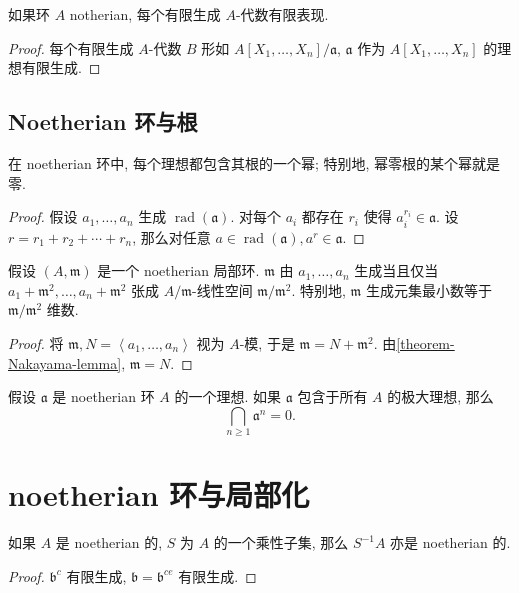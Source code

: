 \begin{corollary}
  如果环 \( A \) notherian, 每个有限生成 \( A \)-代数有限表现.
\end{corollary}
\begin{proof}
  每个有限生成 \( A \)-代数 \( B \) 形如 \( A[X_1, \ldots, X_n] / \mathfrak{a}
  \), \( \mathfrak{a} \) 作为 \( A[X_1, \ldots, X_n] \) 的理想有限生成.
\end{proof}

\subsection{Noetherian 环与根}

\begin{proposition}
  在 noetherian 环中, 每个理想都包含其根的一个幂; 特别地, 幂零根的某个幂就是零.
\end{proposition}
\begin{proof}
  假设 \( a_1, \ldots, a_n \) 生成 \( \operatorname{rad}(\mathfrak{a}) \).
  对每个 \( a_i \) 都存在 \( r_i \) 使得 \( a_i^{r_i} \in \mathfrak{a} \).
  设 \( r = r_1 + r_2 + \cdots + r_n \), 那么对任意 \( a \in
  \operatorname{rad}(\mathfrak{a}), a^r \in \mathfrak{a} \).
\end{proof}

\begin{proposition}
  假设 \( (A, \mathfrak{m}) \) 是一个 noetherian 局部环.
  \( \mathfrak{m} \) 由 \( a_1, \ldots, a_n \) 生成当且仅当
  \( a_1 + \mathfrak{m}^2,\ldots, a_n + \mathfrak{m}^{2} \) 张成 \( A /
  \mathfrak{m} \)-线性空间 \( \mathfrak{m} / \mathfrak{m}^2 \).
  特别地, \( \mathfrak{m} \) 生成元集最小数等于 \( \mathfrak{m} / \mathfrak{m}^2
  \) 维数.
\end{proposition}
\begin{proof}
  将 \(  \mathfrak{m}, N = \left\langle a_1, \ldots, a_n \right\rangle \) 视为
  \( A \)-模, 于是 \( \mathfrak{m} = N + \mathfrak{m}^2 \).
  由\cref{theorem-Nakayama-lemma}, \( \mathfrak{m} = N \).
\end{proof}

\begin{theorem}
  \label{theorem-Krull-intersection}
  假设 \( \mathfrak{a} \) 是 noetherian 环 \( A \) 的一个理想. 如果 \(
  \mathfrak{a} \) 包含于所有 \( A \) 的极大理想, 那么
  \[
    \bigcap_{n \geq 1} \mathfrak{a}^n = 0.
  \]
\end{theorem}

\section{noetherian 环与局部化}

\begin{proposition}
  如果 \( A \) 是 noetherian 的, \( S \) 为 \( A \) 的一个乘性子集, 那么 \(
  S^{-1} A \) 亦是 noetherian 的.
\end{proposition}
\begin{proof}
  \( \mathfrak{b}^c \) 有限生成, \( \mathfrak{b} = \mathfrak{b}^{ce} \)
  有限生成.
\end{proof}

